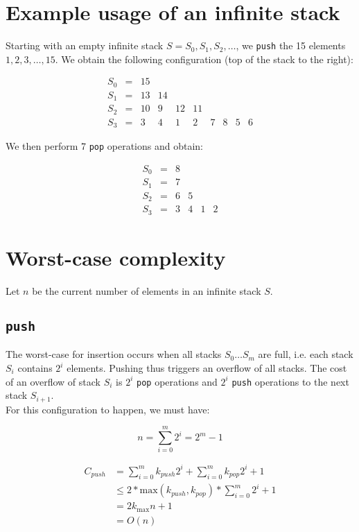 \section{Example usage of an infinite stack}
Starting with an empty infinite stack $S = S_0, S_1, S_2, \ldots$, we \texttt{push} the 15 elements $1, 2, 3,\ldots, 15$. We obtain the following configuration (top of the stack to the right):

\[
\begin{array}{lcccccccccc}
  S_0 & = & 15\\
  S_1 & = & 13 & 14\\
  S_2 & = & 10 & 9 & 12 & 11\\
  S_3 & = & 3 & 4 & 1 & 2 & 7 & 8 & 5 & 6
\end{array}
\]

We then perform 7 \texttt{pop} operations and obtain:

\[
\begin{array}{lcccccccccc}
  S_0 & = & 8\\
  S_1 & = & 7\\
  S_2 & = & 6 & 5 &\\
  S_3 & = & 3 & 4 & 1 & 2
\end{array}
\]

\section{Worst-case complexity}
Let $n$ be the current number of elements in an infinite stack $S$.

  \subsection{\texttt{push}}
  The worst-case for insertion occurs when all stacks $S_0\ldots S_m$ are full, i.e. each stack $S_i$ contains $2^i$ elements. Pushing thus triggers an overflow of all stacks. The cost of an overflow of stack $S_i$ is $2^i$ \texttt{pop} operations and $2^i$ \texttt{push} operations to the next stack $S_{i+1}$.\\
  For this configuration to happen, we must have:

  \[
    n = \sum_{i=0}^m 2^i = 2^m - 1
  \]


  \[
  \begin{array}{ll}
    C_{push} & = \sum_{i=0}^m k_{push} 2^i + \sum_{i=0}^m k_{pop} 2^i + 1\\
             & \leq 2 * \text{max}(k_{push}, k_{pop}) * \sum_{i=0}^m 2^i + 1\\
             & = 2 k_{\text{max}} n + 1\\
             & = O(n)
  \end{array}
  \]

